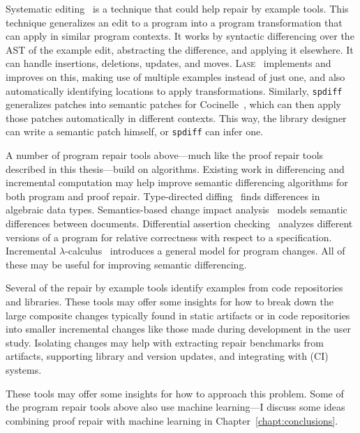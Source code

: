 Systematic editing~\cite{meng2011systematic} is a technique that could help repair by example tools.
This technique generalizes an edit to a program into a program transformation that can apply in similar program contexts.
It works by syntactic differencing over the AST of the example edit, abstracting the difference, and applying it elsewhere.
It can handle insertions, deletions, updates, and moves.
\textsc{Lase}~\cite{meng2013lase} implements and improves on this,
making use of multiple examples instead of just one, %
and also automatically identifying locations to apply transformations.
Similarly, \lstinline{spdiff}~\cite{andersen2010generic} generalizes patches into semantic patches for Cocinelle~\cite{padioleau2008documenting},
which can then apply those patches automatically in different contexts. This way, the library designer can write a semantic patch
himself, or \lstinline{spdiff} can infer one.

A number of program repair tools above---much like the proof repair tools described in this thesis---build on  algorithms.
Existing work in differencing and incremental computation may help 
improve semantic differencing algorithms for both program and proof repair.
Type-directed diffing~\cite{Miraldo:2017:TDS:3122975.3122976}
finds differences in algebraic data types.
Semantics-based change impact analysis~\cite{Autexier:2010:SCI:1860559.1860580} models semantic differences
between documents.
Differential assertion checking~\cite{differential-assertion-checking-2} analyzes different
versions of a program for relative correctness with respect to a specification.
Incremental $\lambda$-calculus~\cite{Cai:2014:TCH:2594291.2594304} introduces a general model for program changes.
All of these may be useful for improving semantic differencing.

Several of the repair by example tools identify examples from code repositories and libraries.
These tools may offer some insights for how to break down the large composite changes typically found in static artifacts or in code repositories
into smaller incremental changes like those made during development in the  user study.
Isolating changes may help with extracting repair benchmarks from artifacts, supporting library and version
updates, and integrating with  (CI) systems.

These tools may offer some insights for how to approach this problem.
Some of the program repair tools above also use machine learning---I discuss some ideas combining proof repair
with machine learning in Chapter~\ref{chapt:conclusions}.

